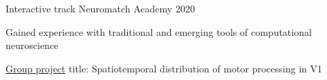 

\begin{cventries}

  \cventry
    {Interactive track} %
    {Neuromatch Academy} %
    {} %
    {2020} %
    {
      \begin{cvitems} %
        \item {Gained experience with traditional and emerging tools of computational neuroscience}
        \item {\href{https://github.com/grawoods/teamA-grebes-NMA2020}{Group project} title: Spatiotemporal distribution of motor processing in V1}
      \end{cvitems}
    }
    
\end{cventries}
